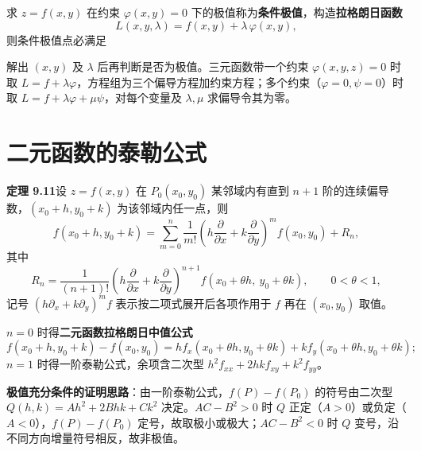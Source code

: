 求 $z=f(x,y)$ 在约束 $\varphi(x,y)=0$ 下的极值称为\textbf{条件极值}，构造\textbf{拉格朗日函数}
\begin{equation}
L(x,y,\lambda)=f(x,y)+\lambda\,\varphi(x,y),
\end{equation}
则条件极值点必满足


解出 $(x,y)$ 及 $\lambda$ 后再判断是否为极值。三元函数带一个约束 $\varphi(x,y,z)=0$ 时取 $L=f+\lambda\varphi$，方程组为三个偏导方程加约束方程；多个约束（$\varphi=0,\psi=0$）时取 $L=f+\lambda\varphi+\mu\psi$，对每个变量及 $\lambda,\mu$ 求偏导令其为零。


\section{二元函数的泰勒公式}

\textbf{定理 9.11}\quad 设 $z=f(x,y)$ 在 $P_0(x_0,y_0)$ 某邻域内有直到 $n+1$ 阶的连续偏导数，$(x_0+h,y_0+k)$ 为该邻域内任一点，则
\begin{equation}
f(x_0+h,y_0+k)=\sum_{m=0}^{n}\frac{1}{m!}\left(h\frac{\partial}{\partial x}+k\frac{\partial}{\partial y}\right)^{m}f(x_0,y_0)+R_n,
\end{equation}
其中
\begin{equation}
R_n=\frac{1}{(n+1)!}\left(h\frac{\partial}{\partial x}+k\frac{\partial}{\partial y}\right)^{n+1}
f(x_0+\theta h,\ y_0+\theta k),\qquad 0<\theta<1 ,
\end{equation}
记号 $\left(h\partial_x+k\partial_y\right)^{m}f$ 表示按二项式展开后各项作用于 $f$ 再在 $(x_0,y_0)$ 取值。

$n=0$ 时得\textbf{二元函数拉格朗日中值公式}
\begin{equation}
f(x_0+h,y_0+k)-f(x_0,y_0)=hf_x(x_0+\theta h,y_0+\theta k)+kf_y(x_0+\theta h,y_0+\theta k);
\end{equation}
$n=1$ 时得一阶泰勒公式，余项含二次型 $h^{2}f_{xx}+2hkf_{xy}+k^{2}f_{yy}$。

\textbf{极值充分条件的证明思路}：由一阶泰勒公式，$f(P)-f(P_0)$ 的符号由二次型 $Q(h,k)=Ah^{2}+2Bhk+Ck^{2}$ 决定。$AC-B^{2}>0$ 时 $Q$ 正定（$A>0$）或负定（$A<0$），$f(P)-f(P_0)$ 定号，故取极小或极大；$AC-B^{2}<0$ 时 $Q$ 变号，沿不同方向增量符号相反，故非极值。

